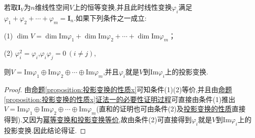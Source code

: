 \documentclass[../../main.tex]{subfiles}
\begin{document}
\begin{corollary}\label{corollary:恒等变换的幂等分解}
若取\(\boldsymbol{I}_V\)为$n$维线性空间\(V\)上的恒等变换,并且此时线性变换\(\varphi_i\)满足\(\varphi_1+\varphi_2+\cdots+\varphi_m = \boldsymbol{I}_n\).如果下列条件之一成立:

(1) \(\dim V=\dim\text{Im}\varphi_1+\dim\text{Im}\varphi_2+\cdots+\dim\text{Im}\varphi_m\)；

(2) \(\varphi_i^2 = \varphi_i\),\(\varphi_i\varphi_j = 0\ (i\neq j)\),

则\(V = \text{Im}\varphi_1\oplus\text{Im}\varphi_2\oplus\cdots\oplus\text{Im}\varphi_m\),并且\(\varphi_i\)就是\(V\)到\(\text{Im}\varphi_i\)上的投影变换.
\end{corollary}
\begin{proof}
由\hyperref[proposition:投影变换的性质x]{命题\ref{proposition:投影变换的性质x}}可知条件(1)(2)等价,并且由\hyperref[proposition:投影变换的性质x]{命题\ref{proposition:投影变换的性质x}证法一的必要性证明过程}可直接由条件(1)推出\(V = \text{Im}\varphi_1\oplus\text{Im}\varphi_2\oplus\cdots\oplus\text{Im}\varphi_m\)(直和的证明也可由条件(2)及\hyperref[proposition:投影变换的性质]{投影变换的性质}直接得到).又因为\hyperlink{幂等变换和投影变换等价}{幂等变换和投影变换等价},故由条件(2)可直接得到\(\varphi_i\)就是\(V\)到\(\text{Im}\varphi_i\)上的投影变换.因此结论得证.
\end{proof}
\end{document}
